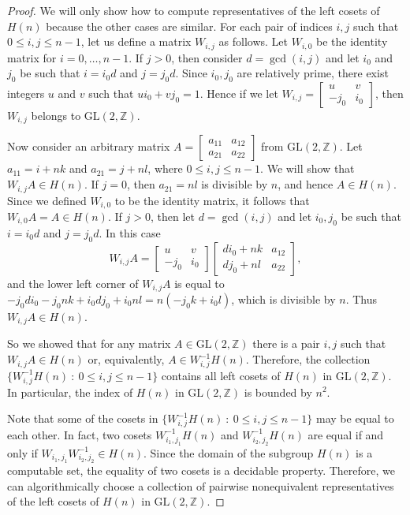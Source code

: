 \documentclass[fontsize=11pt,DIV=13,paper=letter]{scrartcl}
\theoremstyle{definition}
\newcommand{\Z}{\mathbb{Z}}
\newcommand{\GL}{\mathrm{GL}(2,\Z)}
\begin{document}
\begin{proof}
We will only show how to compute representatives of the left cosets of $H(n)$ because the other cases are similar. For each pair of indices $i,j$ such that $0\leq i,j\leq n-1$, let us define a matrix $W_{i,j}$ as follows. Let $W_{i,0}$ be the identity matrix for $i=0,\dots,n-1$. If $j>0$, then consider $d=\gcd(i,j)$ and let $i_0$ and $j_0$ be such that $i=i_0d$ and $j=j_0d$. Since $i_0,j_0$ are relatively prime, there exist integers $u$ and $v$ such that $ui_0+vj_0=1$. Hence if we let $W_{i,j}=\begin{bmatrix} u & v\\ -j_0 & i_0 \end{bmatrix}$, then $W_{i,j}$ belongs to $\GL$.

Now consider an arbitrary matrix $A=\begin{bmatrix} a_{11} & a_{12}\\ a_{21} & a_{22} \end{bmatrix}$ from $\GL$. Let $a_{11}=i+nk$ and $a_{21}=j+nl$, where $0\leq i,j\leq n-1$. We will show that $W_{i,j}A\in H(n)$. If $j=0$, then $a_{21}=nl$ is divisible by $n$, and hence $A\in H(n)$. Since we defined $W_{i,0}$ to be the identity matrix, it follows that $W_{i,0}A = A\in H(n)$. If $j>0$, then let $d=\gcd(i,j)$ and let $i_0,j_0$ be such that $i=i_0d$ and $j=j_0d$. In this case
\[
W_{i,j}A = \begin{bmatrix} u & v\\ -j_0 & i_0 \end{bmatrix}\begin{bmatrix} di_0+nk & a_{12}\\ dj_0+nl & a_{22} \end{bmatrix}\!,
\]
and the lower left corner of $W_{i,j}A$ is equal to $-j_0di_0-j_0nk+i_0dj_0+i_0nl = n(-j_0k+i_0l)$, which is divisible by $n$. Thus $W_{i,j}A\in H(n)$.

So we showed that for any matrix $A\in \GL$ there is a pair $i,j$ such that $W_{i,j}A\in H(n)$ or, equivalently, $A\in W^{-1}_{i,j}H(n)$. Therefore, the collection $\{W^{-1}_{i,j}H(n)\ :\ 0\leq i,j\leq n-1\}$ contains all left cosets of $H(n)$ in $\GL$. In particular, the index of $H(n)$ in $\GL$ is bounded by $n^2$.

Note that some of the cosets in $\{W^{-1}_{i,j}H(n)\ :\ 0\leq i,j\leq n-1\}$ may be equal to each other. In fact, two cosets $W^{-1}_{i_1,j_1}H(n)$ and $W^{-1}_{i_2,j_2}H(n)$ are equal if and only if $W^{}_{i_1,j_1}W^{-1}_{i_2,j_2}\in H(n)$. Since the domain of the subgroup $H(n)$ is a computable set, the equality of two cosets is a decidable property. Therefore, we can algorithmically choose a collection of pairwise nonequivalent representatives of the left cosets of $H(n)$ in $\GL$.

\end{proof}
\end{document}
